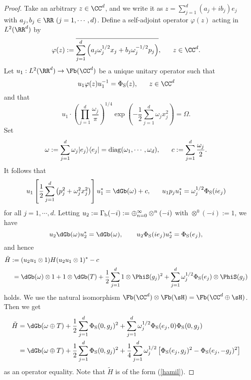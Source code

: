 \documentclass[12pt,draft]{article}
\theoremstyle{plain}
\numberwithin{equation}{section}
\theoremstyle{remark}
\begin{document}
\begin{proof}
Take an arbitrary $z\in\CC^d$, and we write it as $z=\sum_{j=1}^{d}(a_j+ib_j)e_j$ with $a_j, b_j\in\RR\ (j=1,\cdots,d)$.
Define a self-adjoint operator $\varphi(z)$ acting in $L^2(\RR^d)$ by
\[
\varphi(z):=\overline{\sum_{j=1}^d\left(a_j\omega_j^{1/2}x_j
+b_j\omega_j^{-1/2}p_j\right)},\ \ \ \ \ z\in\CC^d.
\]
Let $u_1:L^2(\RR^d)\to\Fb(\CC^d)$ be a unique unitary operator 
such that
\[
u_1\varphi(z)u_1^{-1}=\Phi_{\rm S}(z), \ \ \ \ \ z\in\CC^d
\]
and that 
\[
u_1\cdot\left(\prod_{j=1}^d\frac{\omega_j}{\pi}\right)^{1/4}
\exp{\left(-\frac{1}{2}\sum_{j=1}^d\omega_j x_j^2\right)}=\Omega.
\]
Set 
\[
\omega:=\sum_{j=1}^d\omega_j|e_j\rangle\langle e_j|={\rm diag}(\omega_1,\cdots,\omega_d),\ \ \ \ \ 
c:=\sum_{j=1}^d\frac{\omega_j}{2}.
\]
It follows that
\[
u_1\left[\frac{1}{2}\sum_{j=1}^d\left(p_j^2  + \omega_j^2 x_j^2\right)\right]u_1^*
= \dGb(\omega)+c,
\ \ \ \ \ u_1p_ju_1^*=\omega_j^{1/2}\Phi_{\rm S}(ie_j)
\]
for all $j=1,\cdots,d$.
Letting $u_2:=\Gamma_{\rm b}(-i):=\oplus_{n=0}^\infty\otimes^n(-i)$ with $\otimes^0(-i):=1$, we have
\[
u_2\dGb(\omega)u_2^*=\dGb(\omega),\qquad u_2\Phi_{\rm S}(ie_j)u_2^*=\Phi_{\rm S}(e_j),
\]
and hence
\begin{align*}
\tilde{H} &:= (u_2u_1\otimes 1)H(u_2u_1\otimes 1)^*-c\\
&\phantom{:} =\dGb(\omega)\otimes 1 + 1\otimes\dGb(T)+ \frac{1}{2}\sum_{j=1}^d1\otimes\PhiS(g_j)^2 + \sum_{j=1}^d\omega_j^{1/2}\Phi_{\rm S}(e_j)\otimes\PhiS(g_j)
\end{align*}
holds.
We use the natural isomorphism
$\Fb(\CC^d)\otimes\Fb(\sH)=\Fb(\CC^d\oplus\sH)$.
Then we get
\begin{align*}
\tilde{H}&=\dGb(\omega\oplus T)
+\frac{1}{2}\sum_{j=1}^d\Phi_{\rm S}(0,g_j)^2+\sum_{j=1}^d\omega_j^{1/2}\Phi_{\rm S}(e_j,0)\Phi_{\rm S}(0,g_j)\\
&=\dGb(\omega\oplus T)
+\frac{1}{2}\sum_{j=1}^d\Phi_{\rm S}(0,g_j)^2
+\frac{1}{4}\sum_{j=1}^d\omega_j^{1/2}\left[\Phi_{\rm S}(e_j,g_j)^2-\Phi_{\rm S}(e_j,-g_j)^2\right]
\end{align*}
as an operator equality.
Note that $\tilde{H}$ is of the form (\ref{hamil}).



\end{proof}
\end{document}
